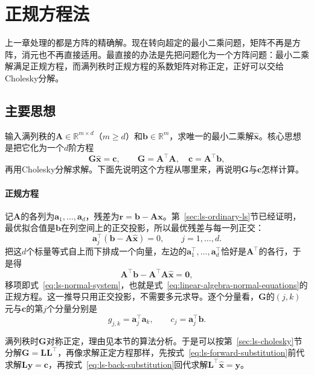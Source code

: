 \section{正规方程法}
\label{sec:ls-normal-equations-method}

上一章处理的都是方阵的精确解。现在转向超定的最小二乘问题，矩阵不再是方阵，消元也不再直接适用。最直接的办法是先把问题化为一个方阵问题：最小二乘解满足正规方程，而满列秩时正规方程的系数矩阵对称正定，正好可以交给Cholesky分解。

\subsection{主要思想}

输入满列秩的$\bm A\in\mathbb R^{m\times d}$（$m\geq d$）和$\bm b\in\mathbb R^m$，求唯一的最小二乘解$\hat{\bm x}$。核心思想是把它化为一个$d$阶方程
\begin{equation}
 \bm G\hat{\bm x}=\bm c,\qquad \bm G=\bm A^\top\bm A,\quad \bm c=\bm A^\top\bm b,
 \label{eq:ls-normal-system}
\end{equation}
再用Cholesky分解求解。下面先说明这个方程从哪里来，再说明$\bm G$与$\bm c$怎样计算。

\paragraph{正规方程}
记$\bm A$的各列为$\bm a_1,\ldots,\bm a_d$，残差为$\bm r=\bm b-\bm A\bm x$。第~\ref{sec:ls-ordinary-ls}节已经证明，最优拟合值是$\bm b$在列空间上的正交投影，所以最优残差与每一列正交：
\[
 \bm a_j^\top(\bm b-\bm A\hat{\bm x})=0,\qquad j=1,\ldots,d .
\]
把这$d$个标量等式自上而下排成一个向量，左边的$\bm a_1^\top,\ldots,\bm a_d^\top$恰好是$\bm A^\top$的各行，于是得
\[
 \bm A^\top\bm b-\bm A^\top\bm A\hat{\bm x}=\bm0 ,
\]
移项即式~\eqref{eq:ls-normal-system}，也就是式~\eqref{eq:linear-algebra-normal-equations}的正规方程。这一推导只用正交投影，不需要多元求导。逐个分量看，$\bm G$的$(j,k)$元与$\bm c$的第$j$个分量分别是
\[
 g_{j,k}=\bm a_j^\top\bm a_k,\qquad c_j=\bm a_j^\top\bm b .
\]

满列秩时$\bm G$对称正定，理由见本节的算法分析。于是可以按第~\ref{sec:ls-cholesky}节分解$\bm G=\bm L\bm L^\top$，再像求解正定方程那样，先按式~\eqref{eq:ls-forward-substitution}前代求解$\bm L\bm y=\bm c$，再按式~\eqref{eq:ls-back-substitution}回代求解$\bm L^\top\hat{\bm x}=\bm y$。

